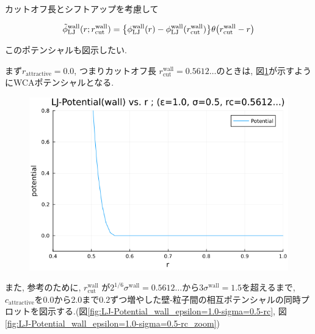 \documentclass[dvipdfmx]{jsarticle}
\numberwithin{equation}{subsection}
\begin{document}
カットオフ長とシフトアップを考慮して



\begin{align}
  \tilde{\phi}_{\text{LJ}}^{\text{wall}}(r;r_{\text{cut}}^{\text{wall}}) = \qty{\phi_{\text{LJ}}^{\text{wall}}(r) - \phi_{\text{LJ}}^{\text{wall}}(r_{\text{cut}}^{\text{wall}})}\theta \qty(r_{\text{cut}}^{\text{wall}}-r) \\
\end{align}

このポテンシャルも図示したい. 

まず$r_{\text{attractive}} =0.0$, つまりカットオフ長 $r_{\text{cut}}^{\text{wall}}=0.5612\dots$のときは, 図\ref{fig:LJ-potential(wall)rc=0.5612}が示すようにWCAポテンシャルとなる.

\begin{figure}[H]
  \centering
  \caption{}
  \label{fig:LJ-potential(wall)rc=0.5612}
  \includegraphics[scale=0.7]{image/LJ-Potential_wall_epsilon=1.0-sigma=0.5-rc=0.56.png}
\end{figure}

また, 参考のために, $r_{\text{cut}}^{\text{wall}}$ が$2^{1/6}\sigma^{\text{wall}}=0.5612\dots$から$3\sigma^{\text{wall}}=1.5$を超えるまで, $c_{\text{attractive}}$を0.0から2.0まで0.2ずつ増やした壁-粒子間の相互ポテンシャルの同時プロットを図示する.(図\ref{fig:LJ-Potential_wall_epsilon=1.0-sigma=0.5-rc}, 図\ref{fig:LJ-Potential_wall_epsilon=1.0-sigma=0.5-rc_zoom})
\end{document}
